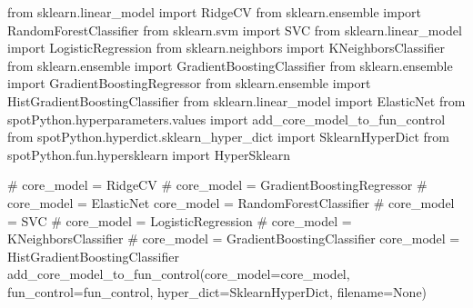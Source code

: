 \documentclass[
  letterpaper,
  DIV=11,
  numbers=noendperiod]{scrreprt}
\newenvironment{Shaded}{\begin{snugshade}}{\end{snugshade}}
\newcommand{\CommentTok}[1]{\textcolor[rgb]{0.37,0.37,0.37}{#1}}
\newcommand{\ImportTok}[1]{\textcolor[rgb]{0.00,0.46,0.62}{#1}}
\newcommand{\NormalTok}[1]{\textcolor[rgb]{0.00,0.23,0.31}{#1}}
\newcommand{\OperatorTok}[1]{\textcolor[rgb]{0.37,0.37,0.37}{#1}}
\newcommand{\VariableTok}[1]{\textcolor[rgb]{0.07,0.07,0.07}{#1}}
\begin{document}
\begin{Shaded}
\begin{Highlighting}[]
\ImportTok{from}\NormalTok{ sklearn.linear\_model }\ImportTok{import}\NormalTok{ RidgeCV}
\ImportTok{from}\NormalTok{ sklearn.ensemble }\ImportTok{import}\NormalTok{ RandomForestClassifier}
\ImportTok{from}\NormalTok{ sklearn.svm }\ImportTok{import}\NormalTok{ SVC}
\ImportTok{from}\NormalTok{ sklearn.linear\_model }\ImportTok{import}\NormalTok{ LogisticRegression}
\ImportTok{from}\NormalTok{ sklearn.neighbors }\ImportTok{import}\NormalTok{ KNeighborsClassifier}
\ImportTok{from}\NormalTok{ sklearn.ensemble }\ImportTok{import}\NormalTok{ GradientBoostingClassifier}
\ImportTok{from}\NormalTok{ sklearn.ensemble }\ImportTok{import}\NormalTok{ GradientBoostingRegressor}
\ImportTok{from}\NormalTok{ sklearn.ensemble }\ImportTok{import}\NormalTok{ HistGradientBoostingClassifier}
\ImportTok{from}\NormalTok{ sklearn.linear\_model }\ImportTok{import}\NormalTok{ ElasticNet}
\ImportTok{from}\NormalTok{ spotPython.hyperparameters.values }\ImportTok{import}\NormalTok{ add\_core\_model\_to\_fun\_control}
\ImportTok{from}\NormalTok{ spotPython.hyperdict.sklearn\_hyper\_dict }\ImportTok{import}\NormalTok{ SklearnHyperDict}
\ImportTok{from}\NormalTok{ spotPython.fun.hypersklearn }\ImportTok{import}\NormalTok{ HyperSklearn}
\end{Highlighting}
\end{Shaded}

\begin{Shaded}
\begin{Highlighting}[]
\CommentTok{\# core\_model  = RidgeCV}
\CommentTok{\# core\_model = GradientBoostingRegressor}
\CommentTok{\# core\_model = ElasticNet}
\NormalTok{core\_model }\OperatorTok{=}\NormalTok{ RandomForestClassifier}
\CommentTok{\# core\_model = SVC}
\CommentTok{\# core\_model = LogisticRegression}
\CommentTok{\# core\_model = KNeighborsClassifier}
\CommentTok{\# core\_model = GradientBoostingClassifier}
\NormalTok{core\_model }\OperatorTok{=}\NormalTok{ HistGradientBoostingClassifier}
\NormalTok{add\_core\_model\_to\_fun\_control(core\_model}\OperatorTok{=}\NormalTok{core\_model,}
\NormalTok{                              fun\_control}\OperatorTok{=}\NormalTok{fun\_control,}
\NormalTok{                              hyper\_dict}\OperatorTok{=}\NormalTok{SklearnHyperDict,}
\NormalTok{                              filename}\OperatorTok{=}\VariableTok{None}\NormalTok{)}
\end{Highlighting}
\end{Shaded}
\end{document}
